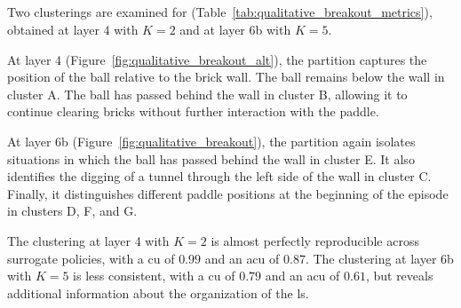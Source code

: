 \newpage
\subsection{\BreakoutName}

Two clusterings are examined for \BreakoutName (Table~\ref{tab:qualitative_breakout_metrics}), obtained at layer 4 with $K=2$ and at layer 6b with $K=5$.

At layer 4 (Figure~\ref{fig:qualitative_breakout_alt}), the partition captures the position of the ball relative to the brick wall.
The ball remains below the wall in cluster A.
The ball has passed behind the wall in cluster B, allowing it to continue clearing bricks without further interaction with the paddle.

At layer 6b (Figure~\ref{fig:qualitative_breakout}), the partition again isolates situations in which the ball has passed behind the wall in cluster E.
It also identifies the digging of a tunnel through the left side of the wall in cluster C.
Finally, it distinguishes different paddle positions at the beginning of the episode in clusters D, F, and G.

The clustering at layer 4 with $K=2$ is almost perfectly reproducible across surrogate policies, with a \gls{cu} of $0.99$ and an \gls{acu} of $0.87$.
The clustering at layer 6b with $K=5$ is less consistent, with a \gls{cu} of $0.79$ and an \gls{acu} of $0.61$, but reveals additional information about the organization of the \gls{ls}.

